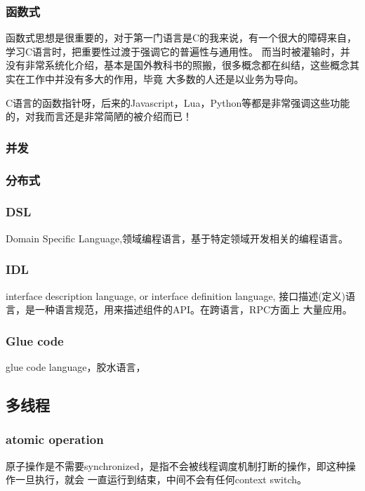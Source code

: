 \subsubsection{函数式}

函数式思想是很重要的，对于第一门语言是C的我来说，有一个很大的障碍来自，学习C语言时，把重要性过渡于强调它的普遍性与通用性。
而当时被灌输时，并没有非常系统化介绍，基本是国外教科书的照搬，很多概念都在纠结，这些概念其实在工作中并没有多大的作用，毕竟
大多数的人还是以业务为导向。

C语言的函数指针呀，后来的Javascript，Lua，Python等都是非常强调这些功能的，对我而言还是非常简陋的被介绍而已！

\subsubsection{并发}

\subsubsection{分布式}

\subsubsection{DSL}
Domain Specific Language,领域编程语言，基于特定领域开发相关的编程语言。

\subsubsection{IDL}
interface description language, or interface definition language,
接口描述(定义)语言，是一种语言规范，用来描述组件的API。在跨语言，RPC方面上
大量应用。

\subsubsection{Glue code}
glue code language，胶水语言，

\subsection{多线程}

\subsubsection{atomic operation}
原子操作是不需要synchronized，是指不会被线程调度机制打断的操作，即这种操作一旦执行，就会
一直运行到结束，中间不会有任何context switch。

